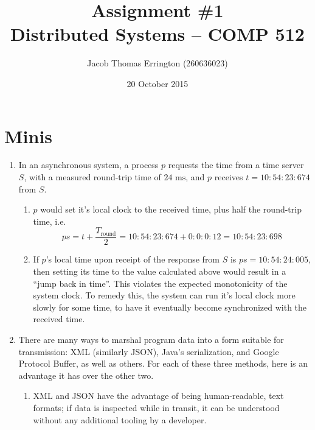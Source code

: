 \documentclass{article}
\author{Jacob Thomas Errington (260636023)}
\title{Assignment \#1\\Distributed Systems -- COMP 512}
\date{20 October 2015}
\newcommand{\ms}{\text{ ms}}
\begin{document}
\maketitle

\section{Minis}

\begin{enumerate}
    \item
        In an asynchronous system, a process $p$ requests the time from a time
        server $S$, with a measured round-trip time of $24\ms$, and $p$
        receives $t = 10:54:23:674$ from $S$.

        \begin{enumerate}
            \item
                $p$ would set it's local clock to the received time, plus half
                the round-trip time, i.e.
                $$
                ps
                = t + \frac{T_\text{round}}{2}
                = 10 : 54 : 23 : 674 + 0 : 0 : 0 : 12
                = 10 : 54 : 23 : 698
                $$

            \item
                If $p$'s local time upon receipt of the response from $S$ is
                $ps = 10 : 54 : 24 : 005$, then setting its time to the value
                calculated above would result in a ``jump back in time''. This
                violates the expected monotonicity of the system clock. To
                remedy this, the system can run it's local clock more slowly
                for some time, to have it eventually become synchronized with
                the received time.
        \end{enumerate}

    \item
        There are many ways to marshal program data into a form suitable
        for transmission: XML (similarly JSON), Java's serialization, and
        Google Protocol Buffer, as well as others. For each of these three
        methods, here is an advantage it has over the other two.

        \begin{enumerate}
            \item
                XML and JSON have the advantage of being human-readable,
                text formats; if data is inspected while in transit, it can
                be understood without any additional tooling by a
                developer.


\end{enumerate}
\end{enumerate}
\end{document}
